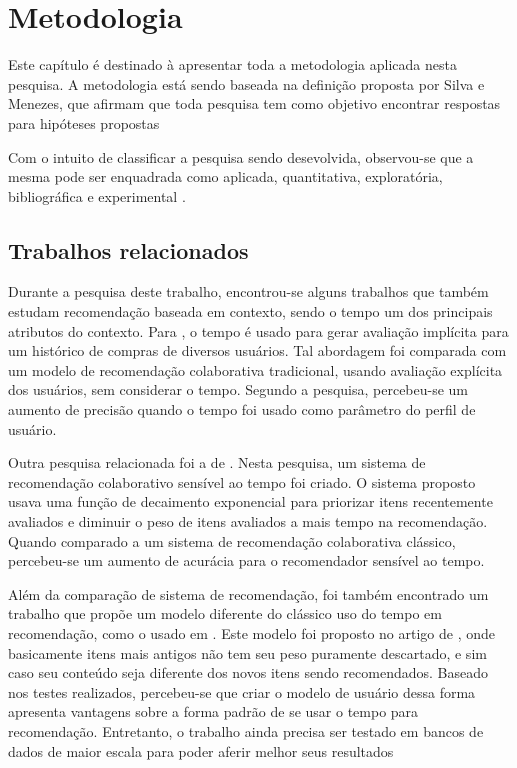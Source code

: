  \chapter[Metodologia]{Metodologia}

  Este capítulo é destinado à apresentar toda a metodologia aplicada nesta
  pesquisa. A metodologia está sendo baseada na definição proposta por Silva e Menezes, que afirmam que toda pesquisa
  tem como objetivo encontrar respostas para hipóteses propostas
  \cite{da2005metodologia}

  Com o intuito de classificar a pesquisa sendo desevolvida, observou-se que a
  mesma pode ser enquadrada como aplicada, quantitativa, exploratória, bibliográfica e
  experimental \cite{da2005metodologia}.


  \section{Trabalhos relacionados}

  Durante a pesquisa deste trabalho, encontrou-se alguns trabalhos que também estudam recomendação baseada em contexto, sendo o tempo um dos
  principais atributos do contexto. Para , o tempo é usado para gerar avaliação implícita para um histórico de
  compras de diversos usuários. Tal abordagem foi comparada com um modelo de recomendação colaborativa tradicional, usando avaliação explícita dos usuários,
  sem considerar o tempo. Segundo a pesquisa, percebeu-se um aumento de precisão
  quando o tempo foi usado como parâmetro do perfil de usuário.

  Outra pesquisa relacionada foi a de . Nesta pesquisa, um
  sistema de recomendação colaborativo sensível ao tempo foi criado. O sistema proposto usava uma função de
  decaimento exponencial para priorizar itens recentemente avaliados e diminuir o peso de itens avaliados a mais tempo na recomendação.
  Quando comparado a um sistema de
  recomendação colaborativa clássico, percebeu-se um aumento de acurácia para o recomendador sensível ao tempo.

  Além da comparação de sistema de recomendação, foi também encontrado um trabalho que propõe um modelo diferente do clássico uso do tempo em recomendação, como o usado em
  . Este modelo foi proposto no artigo de , onde basicamente itens mais antigos não tem seu peso puramente descartado, e sim caso
  seu conteúdo seja diferente dos novos itens sendo recomendados. Baseado nos
  testes realizados, percebeu-se que criar o modelo de usuário dessa forma apresenta vantagens sobre
  a forma padrão de se usar o tempo para recomendação. Entretanto, o trabalho ainda precisa ser testado em bancos de dados de maior escala para poder aferir melhor
  seus resultados

